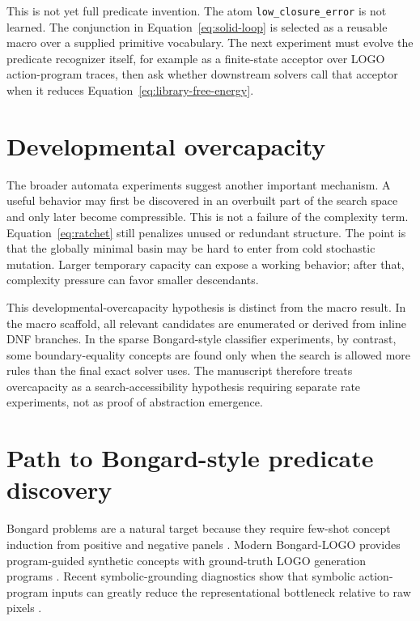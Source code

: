 \documentclass[11pt]{article}
\begin{document}
This is not yet full predicate invention. The atom
\texttt{low\_closure\_error} is not learned. The conjunction in
Equation~\ref{eq:solid-loop} is selected as a reusable macro over a supplied
primitive vocabulary. The next experiment must evolve the predicate recognizer
itself, for example as a finite-state acceptor over LOGO action-program traces,
then ask whether downstream solvers call that acceptor when it reduces
Equation~\ref{eq:library-free-energy}.

\section{Developmental overcapacity}

The broader automata experiments suggest another important mechanism. A useful
behavior may first be discovered in an overbuilt part of the search space and
only later become compressible. This is not a failure of the complexity term.
Equation~\ref{eq:ratchet} still penalizes unused or redundant structure. The
point is that the globally minimal basin may be hard to enter from cold
stochastic mutation. Larger temporary capacity can expose a working behavior;
after that, complexity pressure can favor smaller descendants.

This developmental-overcapacity hypothesis is distinct from the macro result.
In the macro scaffold, all relevant candidates are enumerated or derived from
inline DNF branches. In the sparse Bongard-style classifier experiments, by
contrast, some boundary-equality concepts are found only when the search is
allowed more rules than the final exact solver uses. The manuscript therefore
treats overcapacity as a search-accessibility hypothesis requiring separate
rate experiments, not as proof of abstraction emergence.

\section{Path to Bongard-style predicate discovery}

Bongard problems are a natural target because they require few-shot concept
induction from positive and negative panels \cite{bongard1970pattern}. Modern
Bongard-LOGO provides program-guided synthetic concepts with ground-truth LOGO
generation programs \cite{nie2020bongardlogo}. Recent symbolic-grounding
diagnostics show that symbolic action-program inputs can greatly reduce the
representational bottleneck relative to raw pixels \cite{vaishnav2026symbolic}.
\end{document}
